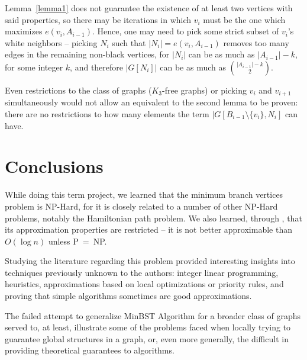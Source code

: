 \documentclass[12pt]{article}
\begin{document}
Lemma~\ref{lemma1} does not guarantee the existence of at least two vertices with said properties, so there may be iterations in which $v_i$ must be the one which maximizes $e(v_i, A_{i - 1})$.
Hence, one may need to pick some strict subset of $v_i$'s white neighbors -- picking $N_i$ such that $|N_i| = e(v_i, A_{i - 1})$ removes too many edges in the remaining non-black vertices, for $|N_i|$ can be as much as $|A_{i - 1}| - k$, for some integer $k$, and therefore $|G[N_i]|$ can be as much as ${|A_{i - 1}| - k}\choose{2}$.

Even restrictions to the class of graphs ($K_3$-free graphs) or picking $v_i$ and $v_{i + 1}$ simultaneously would not allow an equivalent to the second lemma to be proven: there are no restrictions to how many elements the term $|G[B_{i-1} \setminus \{v_i\}, N_i]$ can have.

\section{Conclusions} \label{sec:conclusions}
While doing this term project, we learned that the minimum branch vertices problem is NP-Hard, for it is closely related to a number of other NP-Hard problems, notably the Hamiltonian path problem.
We also learned, through \cite{salamon2010}, that its approximation properties are restricted -- it is not better approximable than $O(\log n)$ unless P~=~NP.

Studying the literature regarding this problem provided interesting insights into techniques previously unknown to the authors: integer linear programming, heuristics, approximations based on local optimizations or priority rules, and proving that simple algorithms sometimes are good approximations.

The failed attempt to generalize MinBST Algorithm for a broader class of graphs served to, at least, illustrate some of the problems faced when locally trying to guarantee global structures in a graph, or, even more generally, the difficult in providing theoretical guarantees to algorithms.



\end{document}
